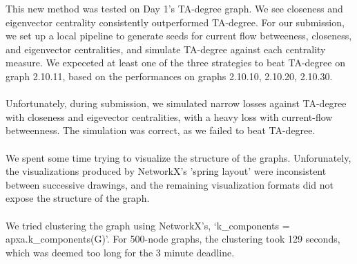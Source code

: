 \documentclass[letterpaper, 11pt]{article}
\begin{document}
This new method was tested on Day 1's TA-degree graph. We see closeness and eigenvector centrality consistently outperformed TA-degree. For our submission, we set up a local pipeline to generate seeds for current flow betweeness, closeness, and eigenvector centralities, and simulate TA-degree against each centrality measure. We expeceted at least one of the three strategies to beat TA-degree on graph 2.10.11, based on the performances on graphs 2.10.10, 2.10.20, 2.10.30.
\\\\
Unfortunately, during submission, we simulated narrow losses against TA-degree with closeness and eigevector centralities, with a heavy loss with current-flow betweenness. The simulation was correct, as we failed to beat TA-degree.
\\\\
We spent some time trying to visualize the structure of the graphs. Unforunately, the visualizations produced by NetworkX's 'spring layout' were inconsistent between successive drawings, and the remaining visualization formats did not expose the structure of the graph.
\\\\
We tried clustering the graph using NetworkX's, ‘k\_components = apxa.k\_components(G)’. For 500-node graphs, the clustering took 129 seconds, which was deemed too long for the 3 minute deadline.
\end{document}
